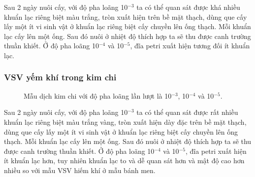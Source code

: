 Sau 2 ngày nuôi cấy, với độ pha loãng 10$^{-3}$ ta có thể quan sát được khá nhiều khuẩn lạc riêng biệt màu trắng, tròn xuất hiện trên bề mặt thạch, dùng que cấy lấy một ít vi sinh vật ở khuẩn lạc riêng biệt cấy chuyền lên ống thạch. Mỗi khuẩn lạc cấy lên một ống. Sau đó nuôi ở nhiệt độ thích hợp ta sẽ thu được canh trường thuần khiết. Ở độ pha loãng 10$^{-4}$ và 10$^{-5}$, đĩa petri xuất hiện tương đối ít khuẩn lạc. 

\subsubsection{VSV yếm khí trong kim chi}

\begin{figure}[h]
      \centering
      \qquad
      \qquad
  \caption{Mẫu dịch kim chi với độ pha loãng lần lượt là 10$^{-3}$, 10$^{-4}$ và 10$^{-5}$.}
\end{figure}

Sau 2 ngày nuôi cấy, với độ pha loãng 10$^{-3}$ ta có thể quan sát được rất nhiều khuẩn lạc riêng biệt màu trắng vàng, tròn xuất hiện dày đặc trên bề mặt thạch, dùng que cấy lấy một ít vi sinh vật ở khuẩn lạc riêng biệt cấy chuyền lên ống thạch. Mỗi khuẩn lạc cấy lên một ống. Sau đó nuôi ở nhiệt độ thích hợp ta sẽ thu được canh trường thuần khiết. Ở độ pha loãng 10$^{-4}$ và 10$^{-5}$, đĩa petri xuất hiện ít khuẩn lạc hơn, tuy nhiên khuẩn lạc to và dễ quan sát hơn và mật độ cao hơn nhiều so với mẫu VSV hiếm khí ở mẫu bánh men.

